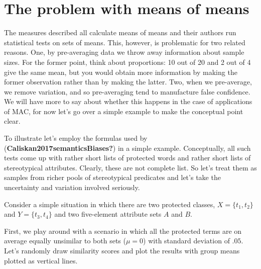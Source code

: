 \documentclass[
  10pt,
  dvipsnames,enabledeprecatedfontcommands]{scrartcl}
\begin{document}
\hypertarget{the-problem-with-means-of-means}{%
\section{The problem with means of
means}\label{the-problem-with-means-of-means}}

The measures described all calculate means of means and their authors
run statistical tests on sets of means. This, however, is problematic
for two related reasons. One, by pre-averaging data we throw away
information about sample sizes. For the former point, think about
proportions: 10 out of 20 and 2 out of 4 give the same mean, but you
would obtain more information by making the former observation rather
than by making the latter. Two, when we pre-average, we remove
variation, and so pre-averaging tend to manufacture false confidence. We
will have more to say about whether this happens in the case of
applications of MAC, for now let's go over a simple example to make the
conceptual point clear.

To illustrate let's employ the formulas used by
(\textbf{Caliskan2017semanticsBiases?}) in a simple example.
Conceptually, all such tests come up with rather short lists of
protected words and rather short lists of stereotypical attributes.
Clearly, these are not complete list. So let's treat them as samples
from richer pools of stereotypical predicates and let's take the
uncertainty and variation involved seriously.

Consider a simple situation in which there are two protected classes,
\(X=\{t_1,t_2\}\) and \(Y=\{t_3,t_4\}\) and two five-element attribute
sets \(A\) and \(B\).

First, we play around with a scenario in which all the protected terms
are on average equally unsimilar to both sets (\(\mu =0\)) with standard
deviation of \(.05\). Let's randomly draw similarity scores and plot the
results with group means plotted as vertical lines.

\footnotesize
\end{document}
